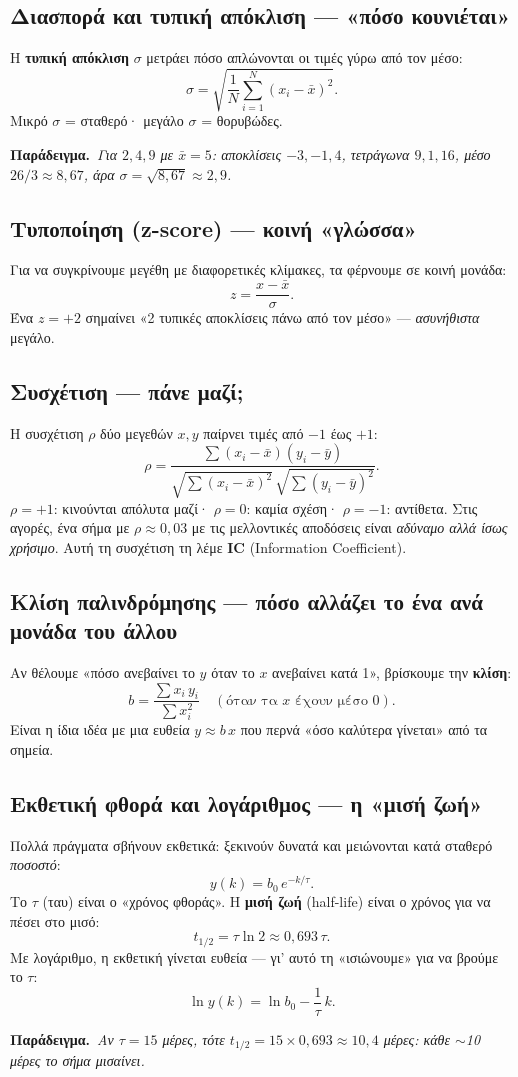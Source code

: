 \documentclass[11pt]{article}
\newcommand{\ex}[1]{\par\smallskip\noindent\textbf{\textcolor{accent}{Παράδειγμα.}}\ \textit{#1}\par\smallskip}
\begin{document}
\subsection{Διασπορά και τυπική απόκλιση — «πόσο κουνιέται»}
Η \textbf{τυπική απόκλιση} $\sigma$ μετράει πόσο απλώνονται οι τιμές γύρω από τον μέσο:
\[ \sigma=\sqrt{\frac{1}{N}\sum_{i=1}^{N}(x_i-\bar{x})^2}. \]
Μικρό $\sigma$ = σταθερό· μεγάλο $\sigma$ = θορυβώδες.
\ex{Για $2,4,9$ με $\bar{x}=5$: αποκλίσεις $-3,-1,4$, τετράγωνα $9,1,16$, μέσο $26/3\approx8{,}67$,
άρα $\sigma=\sqrt{8{,}67}\approx2{,}9$.}

\subsection{Τυποποίηση (z-score) — κοινή «γλώσσα»}
Για να συγκρίνουμε μεγέθη με διαφορετικές κλίμακες, τα φέρνουμε σε κοινή μονάδα:
\[ z=\frac{x-\bar{x}}{\sigma}. \]
Ένα $z=+2$ σημαίνει «2 τυπικές αποκλίσεις πάνω από τον μέσο» — \emph{ασυνήθιστα} μεγάλο.

\subsection{Συσχέτιση — πάνε μαζί;}
Η συσχέτιση $\rho$ δύο μεγεθών $x,y$ παίρνει τιμές από $-1$ έως $+1$:
\[ \rho=\frac{\sum (x_i-\bar{x})(y_i-\bar{y})}{\sqrt{\sum(x_i-\bar{x})^2}\,\sqrt{\sum(y_i-\bar{y})^2}}. \]
$\rho=+1$: κινούνται απόλυτα μαζί· $\rho=0$: καμία σχέση· $\rho=-1$: αντίθετα.
Στις αγορές, ένα σήμα με $\rho\approx0{,}03$ με τις μελλοντικές αποδόσεις είναι \emph{αδύναμο αλλά
ίσως χρήσιμο}. Αυτή τη συσχέτιση τη λέμε \textbf{IC} (Information Coefficient).

\subsection{Κλίση παλινδρόμησης — πόσο αλλάζει το ένα ανά μονάδα του άλλου}
Αν θέλουμε «πόσο ανεβαίνει το $y$ όταν το $x$ ανεβαίνει κατά 1», βρίσκουμε την \textbf{κλίση}:
\[ b=\frac{\sum x_i\,y_i}{\sum x_i^{2}}\quad(\text{όταν τα }x\text{ έχουν μέσο 0}). \]
Είναι η ίδια ιδέα με μια ευθεία $y\approx b\,x$ που περνά «όσο καλύτερα γίνεται» από τα σημεία.

\subsection{Εκθετική φθορά και λογάριθμος — η «μισή ζωή»}
Πολλά πράγματα σβήνουν εκθετικά: ξεκινούν δυνατά και μειώνονται κατά σταθερό \emph{ποσοστό}:
\[ y(k)=b_0\,e^{-k/\tau}. \]
Το $\tau$ (ταυ) είναι ο «χρόνος φθοράς». Η \textbf{μισή ζωή} (half-life) είναι ο χρόνος για να
πέσει στο μισό:
\[ t_{1/2}=\tau\ln 2\approx 0{,}693\,\tau. \]
Με λογάριθμο, η εκθετική γίνεται ευθεία — γι' αυτό τη «ισιώνουμε» για να βρούμε το $\tau$:
\[ \ln y(k)=\ln b_0-\frac{1}{\tau}\,k. \]
\ex{Αν $\tau=15$ μέρες, τότε $t_{1/2}=15\times0{,}693\approx10{,}4$ μέρες: κάθε $\sim$10 μέρες
το σήμα μισαίνει.}
\end{document}
